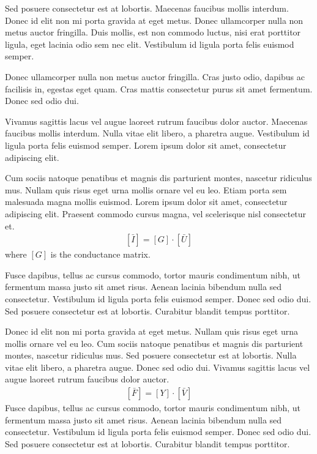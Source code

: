 \documentclass[journal]{../template/IEEEtran}
\begin{document}
Sed posuere consectetur est at lobortis. Maecenas faucibus mollis interdum. Donec id elit non mi porta gravida at eget metus. Donec ullamcorper nulla non metus auctor fringilla. Duis mollis, est non commodo luctus, nisi erat porttitor ligula, eget lacinia odio sem nec elit. Vestibulum id ligula porta felis euismod semper.

Donec ullamcorper nulla non metus auctor fringilla. Cras justo odio, dapibus ac facilisis in, egestas eget quam. Cras mattis consectetur purus sit amet fermentum. Donec sed odio dui.

Vivamus sagittis lacus vel augue laoreet rutrum faucibus dolor auctor. Maecenas faucibus mollis interdum. Nulla vitae elit libero, a pharetra augue. Vestibulum id ligula porta felis euismod semper. Lorem ipsum dolor sit amet, consectetur adipiscing elit.

Cum sociis natoque penatibus et magnis dis parturient montes, nascetur ridiculus mus. Nullam quis risus eget urna mollis ornare vel eu leo. Etiam porta sem malesuada magna mollis euismod. Lorem ipsum dolor sit amet, consectetur adipiscing elit. Praesent commodo cursus magna, vel scelerisque nisl consectetur et.
\begin{align}
	\label{eq:bcurrent}
	\left[\bar{I} \right] = \left[G \right] \cdot \left[ \bar{U} \right]
\end{align}
where $[G]$ is the conductance matrix.

Fusce dapibus, tellus ac cursus commodo, tortor mauris condimentum nibh, ut fermentum massa justo sit amet risus. Aenean lacinia bibendum nulla sed consectetur. Vestibulum id ligula porta felis euismod semper. Donec sed odio dui. Sed posuere consectetur est at lobortis. Curabitur blandit tempus porttitor.

Donec id elit non mi porta gravida at eget metus. Nullam quis risus eget urna mollis ornare vel eu leo. Cum sociis natoque penatibus et magnis dis parturient montes, nascetur ridiculus mus. Sed posuere consectetur est at lobortis. Nulla vitae elit libero, a pharetra augue. Donec sed odio dui. Vivamus sagittis lacus vel augue laoreet rutrum faucibus dolor auctor.
\begin{align}
	\label{eq:full}
	\left[\bar{F} \right] = \left[Y \right] \cdot \left[ \bar{V} \right]
\end{align}
Fusce dapibus, tellus ac cursus commodo, tortor mauris condimentum nibh, ut fermentum massa justo sit amet risus. Aenean lacinia bibendum nulla sed consectetur. Vestibulum id ligula porta felis euismod semper. Donec sed odio dui. Sed posuere consectetur est at lobortis. Curabitur blandit tempus porttitor.
\end{document}
